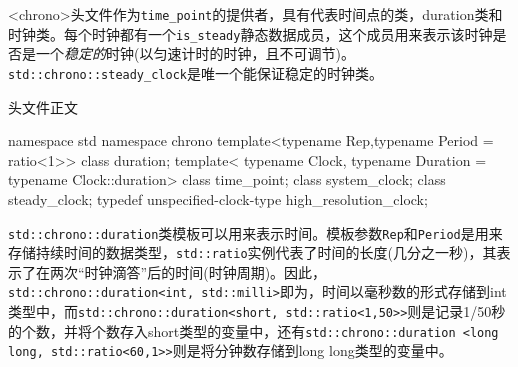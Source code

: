 

<chrono>头文件作为\texttt{time\_point}的提供者，具有代表时间点的类，duration类和时钟类。每个时钟都有一个\texttt{is\_steady}静态数据成员，这个成员用来表示该时钟是否是一个\textit{稳定的}时钟(以匀速计时的时钟，且不可调节)。\texttt{std::chrono::steady\_clock}是唯一个能保证稳定的时钟类。

头文件正文

\begin{cpp}
namespace std
{
  namespace chrono
  {
    template<typename Rep,typename Period = ratio<1>>
    class duration;
    template<
        typename Clock,
        typename Duration = typename Clock::duration>
    class time_point;
    class system_clock;
    class steady_clock;
    typedef unspecified-clock-type high_resolution_clock;
  }
}
\end{cpp}


\texttt{std::chrono::duration}类模板可以用来表示时间。模板参数\texttt{Rep}和\texttt{Period}是用来存储持续时间的数据类型，\texttt{std::ratio}实例代表了时间的长度(几分之一秒)，其表示了在两次“时钟滴答”后的时间(时钟周期)。因此，\texttt{std::chrono::duration<int, std::milli>}即为，时间以毫秒数的形式存储到int类型中，而\texttt{std::chrono::duration<short, std::ratio<1,50>>}则是记录1/50秒的个数，并将个数存入short类型的变量中，还有\texttt{std::chrono::duration <long long, std::ratio<60,1>>}则是将分钟数存储到long long类型的变量中。


